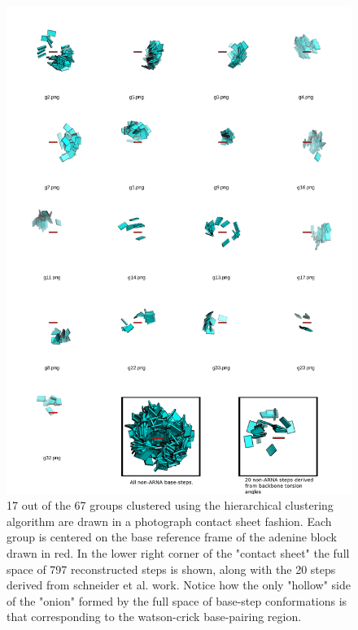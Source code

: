 \begin{figure}
\centering
\includegraphics[angle=0, scale=0.35]{Chapter2/k67_17.png}
\caption{17  out of  the 67  groups clustered  using  the hierarchical
  clustering  algorithm  are  drawn  in  a  photograph  contact  sheet
  fashion. Each group  is centered on the base  reference frame of the
  adenine  block  drawn in  red.  In the  lower  right  corner of  the
  "contact sheet" the full space  of 797 reconstructed steps is shown,
  along with the  20 steps derived from schneider  et al. work. Notice
  how the only "hollow" side of the "onion" formed by the full space of
  base-step  conformations is that  corresponding to  the watson-crick
  base-pairing region.}
\label{fig:noarnak67}
\end{figure}





